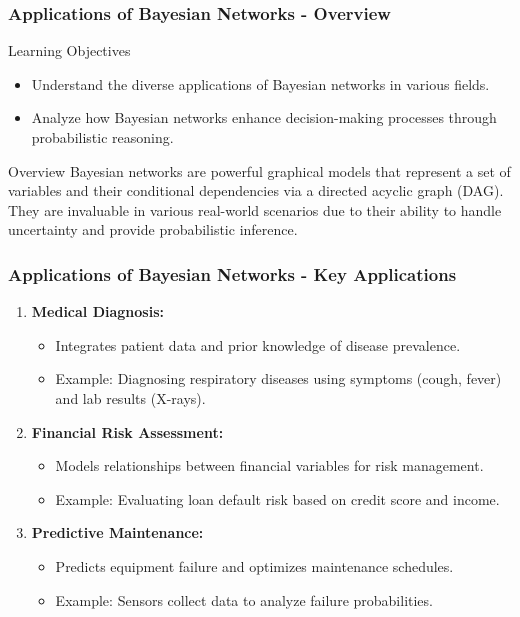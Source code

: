 \documentclass[aspectratio=169]{beamer}
\begin{document}
\begin{frame}[fragile]
    \frametitle{Applications of Bayesian Networks - Overview}
    \begin{block}{Learning Objectives}
        \begin{itemize}
            \item Understand the diverse applications of Bayesian networks in various fields.
            \item Analyze how Bayesian networks enhance decision-making processes through probabilistic reasoning.
        \end{itemize}
    \end{block}
    
    \begin{block}{Overview}
        Bayesian networks are powerful graphical models that represent a set of variables and their conditional dependencies via a directed acyclic graph (DAG). They are invaluable in various real-world scenarios due to their ability to handle uncertainty and provide probabilistic inference.
    \end{block}
\end{frame}

\begin{frame}[fragile]
    \frametitle{Applications of Bayesian Networks - Key Applications}
    \begin{enumerate}
        \item \textbf{Medical Diagnosis:}
        \begin{itemize}
            \item Integrates patient data and prior knowledge of disease prevalence.
            \item Example: Diagnosing respiratory diseases using symptoms (cough, fever) and lab results (X-rays).
        \end{itemize}
        
        \item \textbf{Financial Risk Assessment:}
        \begin{itemize}
            \item Models relationships between financial variables for risk management.
            \item Example: Evaluating loan default risk based on credit score and income.
        \end{itemize}
        
        \item \textbf{Predictive Maintenance:}
        \begin{itemize}
            \item Predicts equipment failure and optimizes maintenance schedules.
            \item Example: Sensors collect data to analyze failure probabilities.
        \end{itemize}
    \end{enumerate}
\end{frame}
\end{document}
